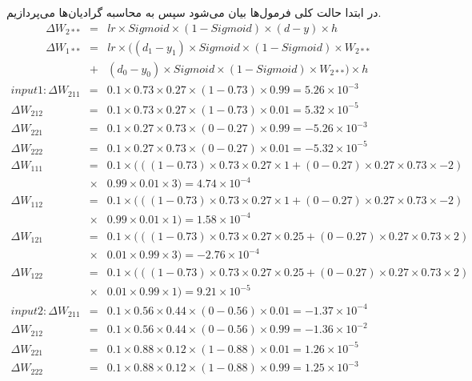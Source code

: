 \documentclass[12pt]{article}
\begin{document}
	در ابتدا حالت کلی فرمول‌ها بیان می‌شود سپس به محاسبه گرادیان‌ها می‌پردازیم.
	\begin{eqnarray*}
		\Delta W_{2**} &=& lr\times Sigmoid \times (1-Sigmoid) \times (d-y) \times h\\
		\Delta W_{1**} &=& lr \times ((d_{1} - y_{1} )\times Sigmoid\times(1-Sigmoid)\times W_{2**} \\
		&+& (d_{0} - y_{0}) \times Sigmoid\times(1-Sigmoid)\times W_{2**})\times h
	\end{eqnarray*}
	\begin{eqnarray*}
	input 1 :\Delta W_{211}&=&0.1\times0.73\times0.27\times(1-0.73)\times0.99=5.26\times10^{-3}\\
	\Delta W_{212}&=&0.1\times0.73\times0.27\times(1-0.73)\times0.01=5.32\times10^{-5}\\
	\Delta W_{221}&=&0.1\times0.27\times0.73\times(0-0.27)\times0.99=-5.26\times10^{-3}\\
	\Delta W_{222}&=&0.1\times0.27\times0.73\times(0-0.27)\times0.01=-5.32\times10^{-5}\\
	\Delta W_{111}&=&0.1\times(((1-0.73)\times0.73\times0.27\times1+(0-0.27)\times0.27\times0.73\times-2)\\
	&\times&0.99\times0.01\times3)=4.74\times10^{-4}\\	
	\Delta 
	W_{112}&=&0.1\times(((1-0.73)\times0.73\times0.27\times1+(0-0.27)\times0.27\times0.73\times-2)\\
	&\times&0.99\times0.01\times1)=1.58\times10^{-4}\\
	\Delta
	W_{121}&=&0.1\times(((1-0.73)\times0.73\times0.27\times0.25+(0-0.27)\times0.27\times0.73\times2)\\
	&\times&0.01\times0.99\times3)=-2.76\times10^{-4}\\
	\Delta
	W_{122}&=&0.1\times(((1-0.73)\times0.73\times0.27\times0.25+(0-0.27)\times0.27\times0.73\times2)\\
	&\times&0.01\times0.99\times1)=9.21\times10^{-5}\\
	input 2 :\Delta W_{211}&=&0.1\times0.56\times0.44\times(0-0.56)\times0.01=-1.37\times10^{-4}\\
	\Delta W_{212}&=&0.1\times0.56\times0.44\times(0-0.56)\times0.99=-1.36\times10^{-2}\\
	\Delta W_{221}&=&0.1\times0.88\times0.12\times(1-0.88)\times0.01=1.26\times10^{-5}\\
	\Delta W_{222}&=&0.1\times0.88\times0.12\times(1-0.88)\times0.99=1.25\times10^{-3}\\

\end{eqnarray*}
\end{document}

